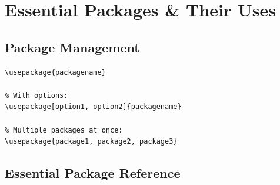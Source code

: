 
\chapter{Essential Packages \& Their Uses}

\section{Package Management}

\begin{lstlisting}[language={[LaTeX]TeX}, caption=Loading packages]
% Basic syntax:
\usepackage{packagename}

% With options:
\usepackage[option1, option2]{packagename}

% Multiple packages at once:
\usepackage{package1, package2, package3}
\end{lstlisting}


\section{Essential Package Reference}

